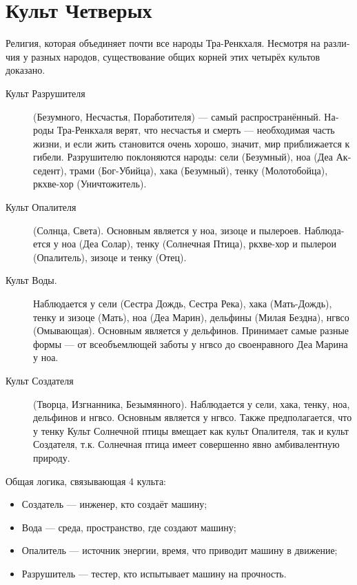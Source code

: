 \documentclass[a4paper,12pt,fleqn]{book}\usepackage{cooltooltips}\usepackage{polyglossia}\setdefaultlanguage[babelshorthands=true]{russian}\setotherlanguage{english}\defaultfontfeatures{Ligatures=TeX,Mapping=tex-text} \usepackage{xcolor}\definecolor{lightgray}{HTML}{bbbbbb}\color{lightgray}\newcommand{\ml}[3]{\textenglish{\textcolor{black}{#3}}}
\begin{document}
{\section{Культ Четверых}

Религия, которая объединяет почти все народы Тра-Ренкхаля.
Несмотря на различия у разных народов, существование общих корней этих четырёх культов доказано.

\begin{description}
\item[Культ Разрушителя] (Безумного, Несчастья, Поработителя) --- самый распространённый.
Народы Тра-Ренкхаля верят, что несчастья и смерть --- необходимая часть жизни, и если жить становится очень хорошо, значит, мир приближается к гибели.
Разрушителю поклоняются народы: сели (Безумный), ноа (Деа Акседент), трами (Бог-Убийца), хака (Безумный), тенку (Молотобойца), ркхве-хор (Уничтожитель).

\item[Культ Опалителя] (Солнца, Света).
Основным является у ноа, зизоце и пылероев.
Наблюдается у ноа (Деа Солар), тенку (Солнечная Птица), ркхве-хор и пылерои (Опалитель), зизоце и тенку (Отец).

\item[Культ Воды.] Наблюдается у сели (Сестра Дождь, Сестра Река), хака (Мать-Дождь), тенку и зизоце (Мать), ноа (Деа Марин), дельфины (Милая Бездна), нгвсо (Омывающая).
Основным является у дельфинов. Принимает самые разные формы --- от всеобъемлющей заботы у нгвсо до своенравного Деа Марина у ноа.

\item[Культ Создателя] (Творца, Изгнанника, Безымянного).
Наблюдается у сели, хака, тенку, ноа, дельфинов и нгвсо.
Основным является у нгвсо.
Также предполагается, что у тенку Культ Солнечной птицы вмещает как культ Опалителя, так и культ Создателя, т.к. Солнечная птица имеет совершенно явно амбивалентную природу.
\end{description}

Общая логика, связывающая 4 культа:

\begin{itemize}
\item Создатель --- инженер, кто создаёт машину;
\item Вода --- среда, пространство, где создают машину;
\item Опалитель --- источник энергии, время, что приводит машину в движение;
\item Разрушитель --- тестер, кто испытывает машину на прочность.
\end{itemize}

}
\end{document}
